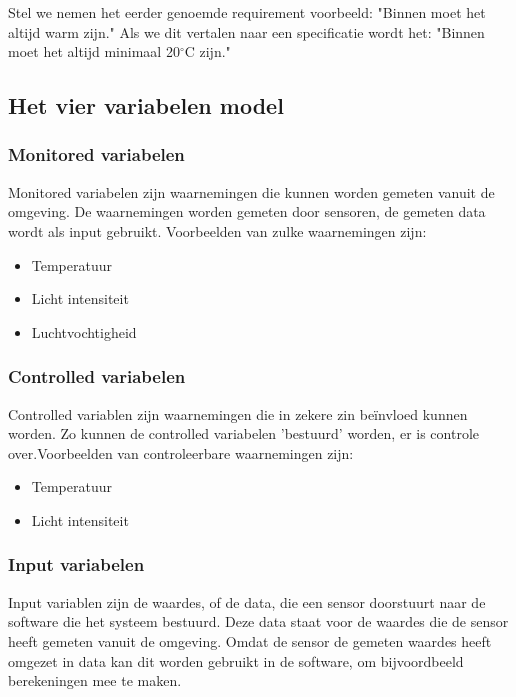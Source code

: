 \documentclass{article}%
\begin{document}
Stel we nemen het eerder genoemde requirement voorbeeld: "Binnen moet het altijd warm zijn." Als we dit vertalen naar een specificatie wordt het: "Binnen moet het altijd minimaal 20$^{\circ}$C zijn."




\clearpage %




\subsection{Het vier variabelen model}

\subsubsection{Monitored variabelen}
Monitored variabelen zijn waarnemingen die kunnen worden gemeten vanuit de omgeving. De waarnemingen worden gemeten door sensoren, de gemeten data wordt als input gebruikt. Voorbeelden van zulke waarnemingen zijn:
\begin{itemize}
  \item Temperatuur
  \item Licht intensiteit
  \item Luchtvochtigheid
\end{itemize}

\subsubsection{Controlled variabelen}
Controlled variablen zijn waarnemingen die in zekere zin beïnvloed kunnen worden. Zo kunnen de controlled variabelen 'bestuurd' worden, er is controle over.Voorbeelden van controleerbare waarnemingen zijn:
\begin{itemize}
  \item Temperatuur
  \item Licht intensiteit
\end{itemize}

\subsubsection{Input variabelen}
Input variablen zijn de waardes, of de data, die een sensor doorstuurt naar de software die het systeem bestuurd. Deze data staat voor de waardes die de sensor heeft gemeten vanuit de omgeving. Omdat de sensor de gemeten waardes heeft omgezet in data kan dit worden gebruikt in de software, om bijvoordbeeld berekeningen mee te maken.
\end{document}
